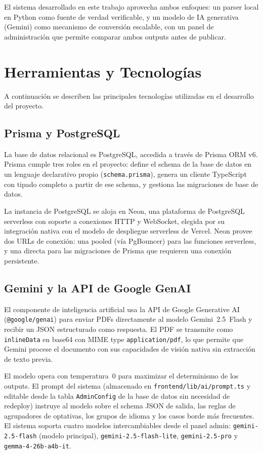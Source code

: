 \documentclass[12pt, a4paper]{report}
\begin{document}
El sistema desarrollado en este trabajo aprovecha ambos enfoques: un parser local en Python
como fuente de verdad verificable, y un modelo de IA generativa (Gemini) como mecanismo de
conversión escalable, con un panel de administración que permite comparar ambos outputs
antes de publicar.

\section{Herramientas y Tecnologías}

A continuación se describen las principales tecnologías utilizadas en el desarrollo del
proyecto.

\subsection{Prisma y PostgreSQL}

La base de datos relacional es PostgreSQL, accedida a través de Prisma ORM v6. Prisma
cumple tres roles en el proyecto: define el schema de la base de datos en un lenguaje
declarativo propio (\texttt{schema.prisma}), genera un cliente TypeScript con tipado
completo a partir de ese schema, y gestiona las migraciones de base de datos.

La instancia de PostgreSQL se aloja en Neon, una plataforma de PostgreSQL serverless con
soporte a conexiones HTTP y WebSocket, elegida por su integración nativa con el modelo de
despliegue serverless de Vercel. Neon provee dos URLs de conexión: una pooled (vía
PgBouncer) para las funciones serverless, y una directa para las migraciones de Prisma que
requieren una conexión persistente.

\subsection{Gemini y la API de Google GenAI}

El componente de inteligencia artificial usa la API de Google Generative AI
(\texttt{@google/genai}) para enviar PDFs directamente al modelo Gemini~2.5~Flash y recibir
un JSON estructurado como respuesta. El PDF se transmite como \texttt{inlineData} en base64
con MIME type \texttt{application/pdf}, lo que permite que Gemini procese el documento con
sus capacidades de visión nativa sin extracción de texto previa.

El modelo opera con temperatura~0 para maximizar el determinismo de los outputs. El prompt
del sistema (almacenado en \texttt{frontend/lib/ai/prompt.ts} y editable desde la tabla
\texttt{AdminConfig} de la base de datos sin necesidad de redeploy) instruye al modelo sobre
el schema JSON de salida, las reglas de agrupadores de optativas, los grupos de idioma y los
casos borde más frecuentes. El sistema soporta cuatro modelos intercambiables desde el panel
admin: \texttt{gemini-2.5-flash} (modelo principal), \texttt{gemini-2.5-flash-lite},
\texttt{gemini-2.5-pro} y \texttt{gemma-4-26b-a4b-it}.
\end{document}
